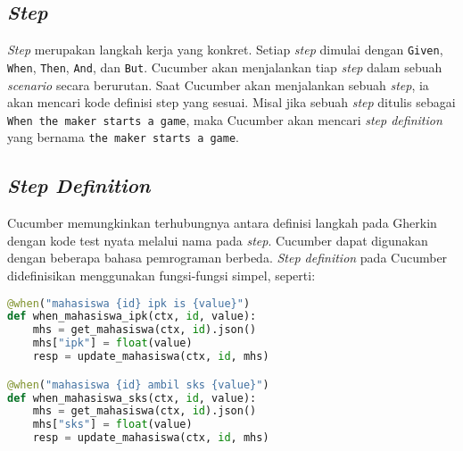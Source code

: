 
\subsection{\emph{Step}}

\emph{Step} merupakan langkah kerja yang konkret.
Setiap \emph{step} dimulai dengan \texttt{Given}, \texttt{When}, \texttt{Then},
\texttt{And}, dan \texttt{But}.
Cucumber akan menjalankan tiap \emph{step} dalam sebuah \emph{scenario} secara berurutan.
Saat Cucumber akan menjalankan sebuah \emph{step}, ia akan mencari kode definisi step yang sesuai.
Misal jika sebuah \emph{step} ditulis sebagai \texttt{When the maker starts a game},
maka Cucumber akan mencari \emph{step definition} yang bernama
\texttt{the maker starts a game}.

\subsection{\emph{Step Definition}}

Cucumber memungkinkan terhubungnya antara definisi langkah pada Gherkin
dengan kode test nyata melalui nama pada \emph{step}.
Cucumber dapat digunakan dengan beberapa bahasa pemrograman berbeda.
\emph{Step definition} pada Cucumber didefinisikan menggunakan fungsi-fungsi simpel, seperti:

\begin{lstlisting}[language=python]
@when("mahasiswa {id} ipk is {value}")
def when_mahasiswa_ipk(ctx, id, value):
    mhs = get_mahasiswa(ctx, id).json()
    mhs["ipk"] = float(value)
    resp = update_mahasiswa(ctx, id, mhs)

@when("mahasiswa {id} ambil sks {value}")
def when_mahasiswa_sks(ctx, id, value):
    mhs = get_mahasiswa(ctx, id).json()
    mhs["sks"] = float(value)
    resp = update_mahasiswa(ctx, id, mhs)
\end{lstlisting}



